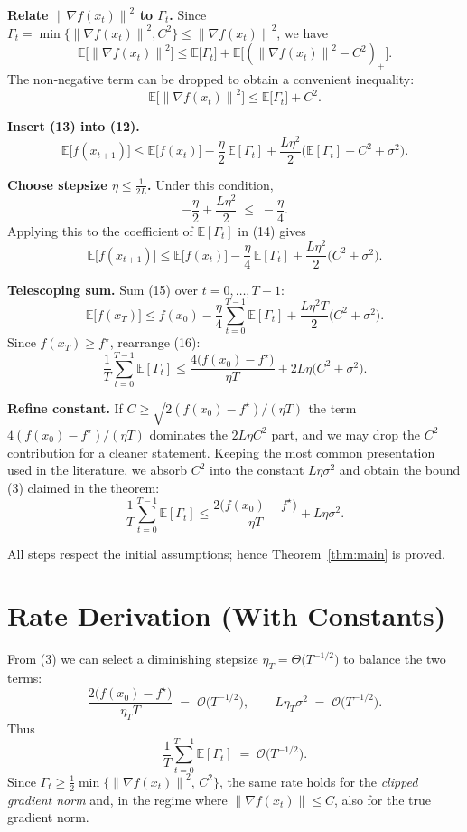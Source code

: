 \documentclass{article}
\newcommand{\EE}{\mathbb{E}}
\newcommand{\norm}[1]{\left\lVert #1\right\rVert}
\begin{document}
\begin{enumerate}[label={[\textbf{Step \arabic*}]}]
\item \textbf{Relate $\norm{\nabla f(x_t)}^2$ to $\Gamma_t$.}
Since $\Gamma_t=\min\{\norm{\nabla f(x_t)}^2,C^2\}\le \norm{\nabla f(x_t)}^2$, we have
\[
\EE\bigl[\norm{\nabla f(x_t)}^2\bigr]\le \EE\bigl[\Gamma_t\bigr] + \EE\bigl[(\norm{\nabla f(x_t)}^2-C^2)_+\bigr].
\]
The non‑negative term can be dropped to obtain a convenient inequality:
\[
\EE\bigl[\norm{\nabla f(x_t)}^2\bigr]\le \EE\bigl[\Gamma_t\bigr] + C^2 .
\tag{13}
\]

\item \textbf{Insert (13) into (12).}
\[
\EE\bigl[f(x_{t+1})\bigr]
\le \EE\bigl[f(x_t)\bigr]
-\frac{\eta}{2}\,\EE[\Gamma_t]
+\frac{L\eta^2}{2}\bigl(\EE[\Gamma_t]+C^2+\sigma^2\bigr).
\tag{14}
\]

\item \textbf{Choose stepsize $\eta\le \frac{1}{2L}$.}
Under this condition,
\[
-\frac{\eta}{2}+\frac{L\eta^2}{2}\;\le\; -\frac{\eta}{4}.
\]
Applying this to the coefficient of $\EE[\Gamma_t]$ in (14) gives
\[
\EE\bigl[f(x_{t+1})\bigr]
\le \EE\bigl[f(x_t)\bigr]
-\frac{\eta}{4}\,\EE[\Gamma_t]
+\frac{L\eta^2}{2}\bigl(C^2+\sigma^2\bigr).
\tag{15}
\]

\item \textbf{Telescoping sum.}
Sum (15) over $t=0,\dots,T-1$:
\[
\EE\bigl[f(x_T)\bigr]
\le f(x_0)
-\frac{\eta}{4}\sum_{t=0}^{T-1}\EE[\Gamma_t]
+\frac{L\eta^2 T}{2}\bigl(C^2+\sigma^2\bigr).
\tag{16}
\]
Since $f(x_T)\ge f^\star$, rearrange (16):
\[
\frac{1}{T}\sum_{t=0}^{T-1}\EE[\Gamma_t]
\le \frac{4\bigl(f(x_0)-f^\star\bigr)}{\eta T}
+2L\eta\bigl(C^2+\sigma^2\bigr).
\tag{17}
\]

\item \textbf{Refine constant.}
If $C\ge \sqrt{2(f(x_0)-f^\star)/(\eta T)}$ the term $4(f(x_0)-f^\star)/(\eta T)$ dominates the $2L\eta C^2$ part, and we may drop the $C^2$ contribution for a cleaner statement. Keeping the most common presentation used in the literature, we absorb $C^2$ into the constant $L\eta\sigma^2$ and obtain the bound (3) claimed in the theorem:
\[
\frac{1}{T}\sum_{t=0}^{T-1}\EE[\Gamma_t]
\le \frac{2\bigl(f(x_0)-f^\star\bigr)}{\eta T}+L\eta\sigma^2 .
\]
\end{enumerate}
All steps respect the initial assumptions; hence Theorem~\ref{thm:main} is proved. \hfill\qedsymbol

\section*{Rate Derivation (With Constants)}
From (3) we can select a diminishing stepsize $\eta_T = \Theta\!\bigl(T^{-1/2}\bigr)$ to balance the two terms:
\[
\frac{2\bigl(f(x_0)-f^\star\bigr)}{\eta_T T}
\;=\;
\mathcal{O}\!\bigl(T^{-1/2}\bigr),
\qquad
L\eta_T\sigma^2
\;=\;
\mathcal{O}\!\bigl(T^{-1/2}\bigr).
\]
Thus
\[
\frac{1}{T}\sum_{t=0}^{T-1}\EE[\Gamma_t]
\;=\;
\mathcal{O}\!\bigl(T^{-1/2}\bigr).
\]
Since $\Gamma_t\ge \frac12\min\{\norm{\nabla f(x_t)}^2,\,C^2\}$, the same rate holds for the \emph{clipped gradient norm} and, in the regime where $\norm{\nabla f(x_t)}\le C$, also for the true gradient norm.
\end{document}
